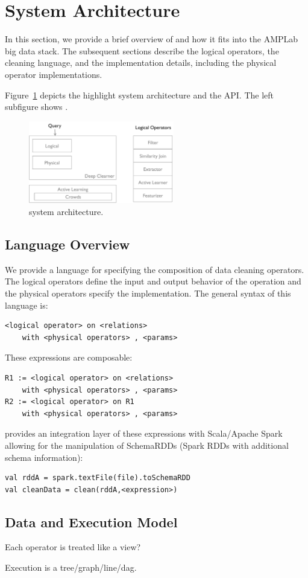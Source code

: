 \section{System Architecture}

In this section, we provide a brief overview of \sys and how it fits into
the AMPLab big data stack.
The subsequent sections describe the logical operators, the cleaning language,
and the implementation details, including the physical operator implementations.

Figure~\ref{fig:arch} depicts the highlight system architecture and the API. 
The left subfigure shows .

  \begin{figure}[h]
  \centering
  \includegraphics[width = 2.5in]{figs/architecture}
  \caption{\sys system architecture.}
  \label{fig:arch}
  \end{figure}


\subsection{Language Overview}
We provide a language for specifying the composition of data cleaning operators.
The logical operators define the input and output behavior of the operation and 
the physical operators specify the implementation.
The general syntax of this language is:
\begin{lstlisting}
<logical operator> on <relations>
	with <physical operators> , <params>
\end{lstlisting}
These expressions are composable:
\begin{lstlisting}
R1 := <logical operator> on <relations> 
	with <physical operators> , <params>
R2 := <logical operator> on R1 
	with <physical operators> , <params>
\end{lstlisting}
\projx provides an integration layer of these expressions with Scala/Apache Spark allowing for the manipulation of SchemaRDDs (Spark RDDs with additional schema information):
\begin{lstlisting}
val rddA = spark.textFile(file).toSchemaRDD
val cleanData = clean(rddA,<expression>)
\end{lstlisting}


\subsection{Data and Execution Model}


Each operator is treated like a view?

Execution is a tree/graph/line/dag.



